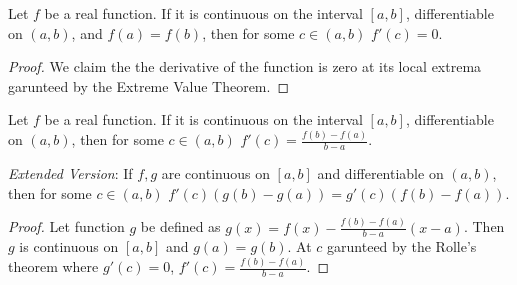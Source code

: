 \documentclass[../note.tex]{subfiles}
\begin{document}


\begin{theorem}
	Let $f$ be a real function. If it is continuous on the interval $[a,b]$, differentiable on $(a,b)$, and $f(a)=f(b)$, then for some $c \in (a,b)$ $f'(c)=0$.
\end{theorem}
\begin{proof}
	We claim the the derivative of the function is zero at its local extrema garunteed by the Extreme Value Theorem.
\end{proof}

\begin{theorem}
	Let $f$ be a real function. If it is continuous on the interval $[a,b]$, differentiable on $(a,b)$, then for some $c \in (a,b)$ $f'(c)=\frac{f(b)-f(a)}{b-a}$.

	\emph{Extended Version}: 
	If $f,g$ are continuous on $[a,b]$ and differentiable on $(a,b)$, then for some $c \in (a,b)$ $f'(c)(g(b)-g(a))=g'(c)(f(b)-f(a))$.
\end{theorem}

\begin{proof}
	Let function $g$ be defined as $g(x)=f(x)-\frac{f(b)-f(a)}{b-a}(x-a)$. Then $g$ is continuous on $[a,b]$ and $g(a)=g(b)$. At $c$ garunteed by the Rolle's theorem where $g'(c)=0$, $f'(c) = \frac{f(b)-f(a)}{b-a}$.
\end{proof}

\theorem[Bernoulli's Inequality]{
	Let $\alpha >0$ and $\delta l\geq -1$. Then 
	\begin{enumerate}
		\item $(1+\delta)^{\alpha} \leq 1+\delta\alpha$ if $\alpha \in (0,1]$,
		\item $(1+\delta)^{\alpha} \geq 1+\delta\alpha$ if $\alpha \in [1,\infty)$,
	\end{enumerate}
}
\end{document}
